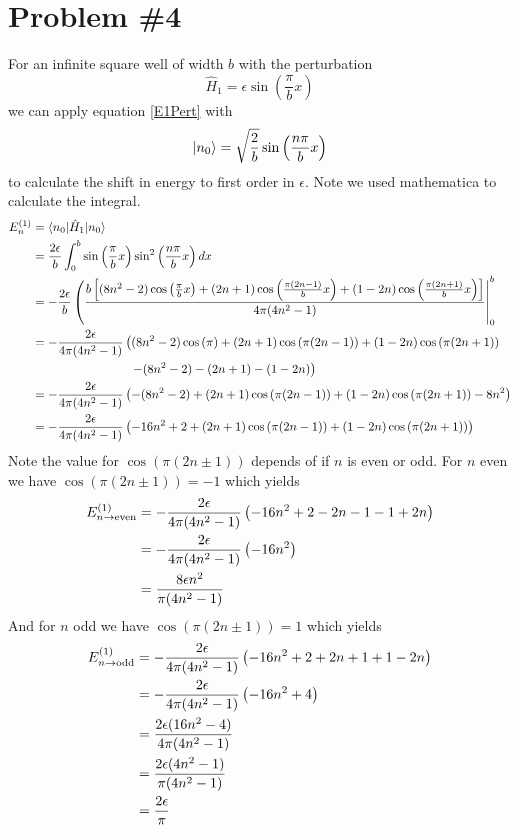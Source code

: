 \documentclass[11pt]{article}
\numberwithin{equation}{section}
\begin{document}
\section{Problem \#4}
For an infinite square well of width $b$ with the perturbation 
$$\hat{H}_1 = \epsilon\sin\left(\frac{\pi}{b}x\right)$$
we can apply equation \ref{E1Pert} with 
$$|{n_0}\rangle = \sqrt{\frac{2}{b}}\sin\left(\frac{n\pi}{b}x\right)$$
to calculate the shift in energy to first order in $\epsilon$. Note we used mathematica to calculate the integral.
\begin{align*}
E_n^{(1)} &= \bra{n_0}\hat{H}_1\ket{n_0}\\
&= \frac{2\epsilon}{b}\int_{0}^{b}\sin\left(\frac{\pi}{b}x\right)\sin^2\left(\frac{n\pi}{b}x\right)dx\\
&= -\frac{2\epsilon}{b}\left(\frac{b\left[(8n^2-2)\cos\left(\frac{\pi}{b}x\right)+(2n+1)\cos\left(\frac{\pi(2n-1)}{b}x\right)+(1-2n)\cos\left(\frac{\pi(2n+1)}{b}x\right)\right]}{4\pi(4n^2-1)}\right|_{0}^{b}\\
&= -\frac{2\epsilon}{4\pi(4n^2-1)}\left((8n^2-2)\cos\left(\pi\right)+(2n+1)\cos\left(\pi(2n-1)\right)+(1-2n)\cos\left(\pi(2n+1)\right)\right.\\
& \ \ \ \ \ \ \ \ \ \ \ \ \ \ \ \ \ \ \ \ \ \ \ \ \left.-(8n^2-2)-(2n+1)-(1-2n)\right)\\
&= -\frac{2\epsilon}{4\pi(4n^2-1)}\left(-(8n^2-2) + (2n+1)\cos\left(\pi(2n-1)\right)+(1-2n)\cos\left(\pi(2n+1)\right) - 8n^2\right)\\
&= -\frac{2\epsilon}{4\pi(4n^2-1)}\left(-16n^2+2 + (2n+1)\cos\left(\pi(2n-1)\right)+(1-2n)\cos\left(\pi(2n+1)\right)\right)
\end{align*}
Note the value for $\cos(\pi(2n\pm1))$ depends of if $n$ is even or odd. For $n$ even we have $\cos(\pi(2n\pm1)) = -1$ which yields
\begin{align*}
E_{n\rightarrow\textnormal{even}}^{(1)} &= -\frac{2\epsilon}{4\pi(4n^2-1)}\left(-16n^2+2 - 2n - 1 - 1 + 2n\right)\\
&= -\frac{2\epsilon}{4\pi(4n^2-1)}\left(-16n^2\right)\\
&= \frac{8\epsilon n^2}{\pi(4n^2-1)}
\end{align*}
And for $n$ odd we have $\cos(\pi(2n\pm1)) = 1$ which yields
\begin{align*}
E_{n\rightarrow\textnormal{odd}}^{(1)} &= -\frac{2\epsilon}{4\pi(4n^2-1)}\left(-16n^2+2 + 2n + 1 + 1 - 2n\right)\\
&= -\frac{2\epsilon}{4\pi(4n^2-1)}\left(-16n^2+4\right)\\
&= \frac{2\epsilon(16n^2-4)}{4\pi(4n^2-1)}\\
&= \frac{2\epsilon(4n^2-1)}{\pi(4n^2-1)}\\
&= \frac{2\epsilon}{\pi}
\end{align*}
\end{document}
